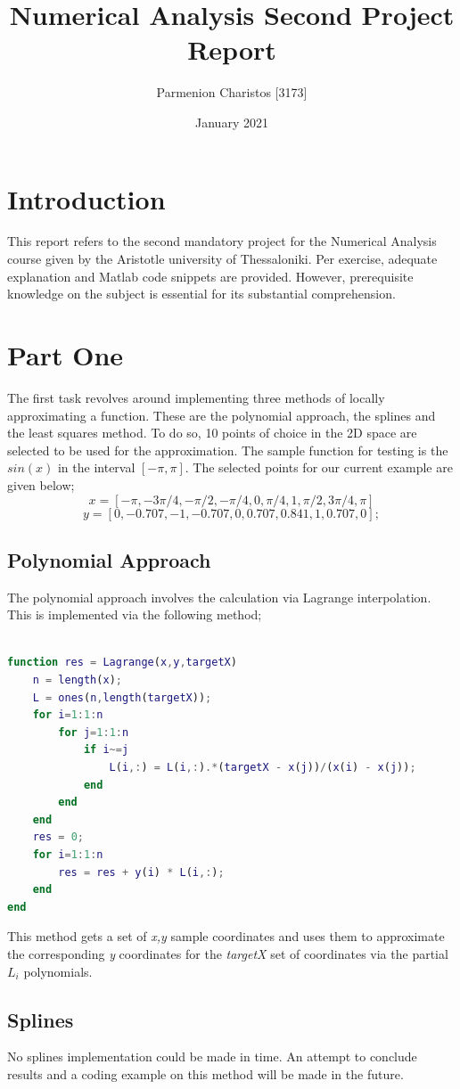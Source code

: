 \documentclass{article}
\title{Numerical Analysis Second Project Report}
\author{Parmenion Charistos [3173]}
\date{January 2021}
\begin{document}
\maketitle

\section*{Introduction}
This report refers to the second mandatory project for the Numerical Analysis course given by the Aristotle university of Thessaloniki. Per exercise, adequate explanation and Matlab code snippets are provided. However, prerequisite knowledge on the subject is essential for its substantial comprehension.

\section{Part One}
The first task revolves around implementing three methods of locally approximating a function. These are the polynomial approach, the splines and the least squares method. To do so, 10 points of choice in the 2D space are selected to be used for the approximation. The sample function for testing is the $sin(x)$ in the interval $[-\pi,\pi]$. The selected points for our current example are given below; 
\[x = [-\pi,-3\pi/4,-\pi/2,-\pi/4,0,\pi/4,1,\pi/2,3\pi/4,\pi]\]
\[y = [0,-0.707,-1,-0.707,0,0.707,0.841,1,0.707,0];\]

\subsection{Polynomial Approach}
The polynomial approach involves the calculation via Lagrange interpolation. This is implemented via the following method;
\begin{lstlisting}[language=Matlab]

function res = Lagrange(x,y,targetX)
    n = length(x);
    L = ones(n,length(targetX));
    for i=1:1:n
        for j=1:1:n
            if i~=j
                L(i,:) = L(i,:).*(targetX - x(j))/(x(i) - x(j));
            end
        end
    end
    res = 0;
    for i=1:1:n
        res = res + y(i) * L(i,:);
    end
end
\end{lstlisting}
This method gets a set of \emph{x,y} sample coordinates and uses them to approximate the corresponding \emph{y} coordinates for the \emph{targetX} set of coordinates via the partial $L_i$ polynomials.
\pagebreak

\subsection{Splines}
No splines implementation could be made in time. An attempt to conclude results and a coding example on this method will be made in the future.
\end{document}
